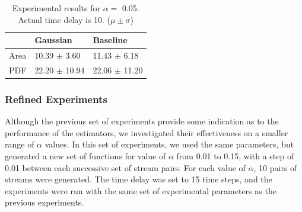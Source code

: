 \documentclass[a4paper,11pt]{article}
\begin{document}
\begin{table}[htb]

\begin{center}
\begin{tabular}{l|ll}
       &  Gaussian           &  Baseline           \\
\hline
 Area  &  10.39 $\pm$ 3.60   &  11.43 $\pm$ 6.18   \\
 PDF   &  22.20 $\pm$ 10.94  &  22.06 $\pm$ 11.20  \\
\end{tabular}
\end{center}
\caption{Experimental results for $\alpha=$ 0.05. Actual time delay is 10. ($\mu\pm\sigma$)} \label{fig:pretab}\end{table}
\subsubsection{Refined Experiments}
\label{sec-8-1-2}

    Although the previous set of experiments provide some indication as to the
    performance of the estimators, we investigated their effectiveness on a smaller
    range of $\alpha$ values. In this set of experiments, we used the same
    parameters, but generated a new set of functions for value of $\alpha$ from
    0.01 to 0.15, with a step of 0.01 between each successive set of stream
    pairs. For each value of $\alpha$, 10 pairs of streams were generated. The time
    delay was set to 15 time steps, and the experiments were run with the same set
    of experimental parameters as the previous experiments.
\end{document}
